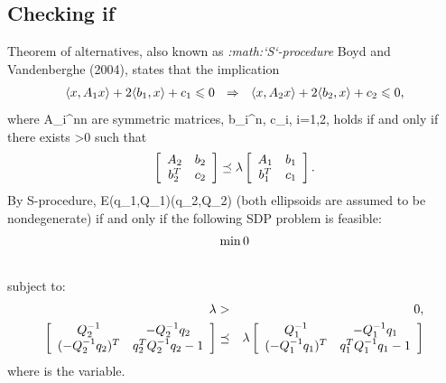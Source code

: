 \documentclass[letterpaper,10pt,english]{sphinxmanual}
\begin{document}
\subsection{Checking if}
\label{chap_ellcalc:checking-if}
Theorem of alternatives, also known as \emph{:math:{}`S{}`-procedure} Boyd and
Vandenberghe (2004), states that the implication
\begin{gather}
\begin{split}\langle x, A_1x\rangle + 2\langle b_1,x\rangle + c_1 \leqslant0
~~ \Rightarrow ~~
\langle x, A_2x\rangle + 2\langle b_2,x\rangle + c_2 \leqslant0,\end{split}\notag
\end{gather}
where A_i^{n\times n} are symmetric matrices,
b_i^n, c_i, i=1,2, holds if
and only if there exists \lambda>0 such that
\begin{gather}
\begin{split}\left[\begin{array}{cc}
A_2 & b_2\\
b_2^T & c_2\end{array}\right]
\preceq
\lambda\left[\begin{array}{cc}
A_1 & b_1\\
b_1^T & c_1\end{array}\right].\end{split}\notag
\end{gather}
By S-procedure,
{\mathcal E}(q_1,Q_1)(q_2,Q_2) (both
ellipsoids are assumed to be nondegenerate) if and only if the following
SDP problem is feasible:
\begin{gather}
\begin{split}\min 0\end{split}\notag\\\begin{split}\end{split}\notag
\end{gather}
subject to:
\begin{gather}
\begin{split}\begin{aligned}
\lambda & > & 0, \\
\left[\begin{array}{cc}
Q_2^{-1} & -Q_2^{-1}q_2\\
(-Q_2^{-1}q_2)^T & q_2^TQ_2^{-1}q_2-1\end{array}\right]
& \preceq &
\lambda \left[\begin{array}{cc}
Q_1^{-1} & -Q_1^{-1}q_1\\
(-Q_1^{-1}q_1)^T & q_1^TQ_1^{-1}q_1-1\end{array}\right]\end{aligned}\end{split}\notag
\end{gather}
where \lambda{} is the variable.
\end{document}

